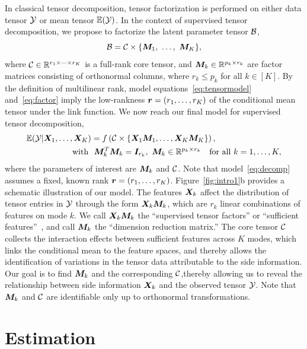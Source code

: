 \documentclass{article}
\theoremstyle{definition}
\theoremstyle{definition}
\begin{document}
In classical tensor decomposition, tensor factorization is performed on either data tensor $\mathcal{Y}$ or mean tensor $\mathbb{E}(\mathcal{Y})$. In the context of supervised tensor decomposition, we propose to factorize the latent parameter tensor $\mathcal{B}$,
\begin{equation}\label{eq:factor}
\mathcal{B}=\mathcal{C}\times\{\bm M_1,\ \ldots,\ \bm M_K\},
\end{equation}
where $\mathcal{C}\in\mathbb{R}^{r_1\times \cdots \times r_K}$ is a full-rank core tensor, and $\bm M_k\in\mathbb{R}^{p_k\times r_k}$ are factor matrices consisting of orthonormal columns, where $r_k\leq p_k$ for all $k\in[K]$. By the definition of multilinear rank, model equations~\eqref{eq:tensormodel} and~\eqref{eq:factor} imply the low-rankness $\bm{r}=(r_1,\ldots,r_K)$ of the conditional mean tensor under the link function. We now reach our final model for supervised tensor decomposition,
\begin{align}\label{eq:decomp}
\mathbb{E}(\tY|\mX_1,\ldots,\mX_K) &= f\left(\tC\times\{\mX_1\mM_1, \ldots, \mX_K\mM_K\}\right),\notag\\
\text{with} \ &\ \mM_k^T\mM_k = \mI_{r_k},\ \mM_k\in\mathbb{R}^{p_k\times r_k}\quad \text{for all }k=1,\ldots,K,
\end{align}
where the parameters of interest are $\bm M_k$ and $\mathcal{C}$. Note that model~\eqref{eq:decomp} assumes a fixed, known rank $\bm{r}=(r_1,\ldots,r_K)$. Figure~\ref{fig:intro1}b provides a schematic illustration of our model. The features $\bm X_k$ affect the distribution of tensor entries in $\mathcal{Y}$ through the form $\bm X_k\bm M_k$, which are $r_k$ linear combinations of features on mode $k$. We call $\bm X_k\bm M_k$ the ``supervised tensor factors'' or ``sufficient features''~\citep{adragni2009sufficient}, and call $\bm M_k$ the ``dimension reduction matrix.'' The core tensor $\mathcal{C}$ collects the interaction effects between sufficient features across $K$ modes, which links the conditional mean to the feature spaces, and thereby allows the identification of variations in the tensor data attributable to the side information. Our goal is to find $\bm M_k$ and the corresponding $\mathcal{C}$,thereby allowing us to reveal the relationship between side information $\bm X_k$ and the observed tensor $\mathcal{Y}$. Note that $\bm M_k$ and $\mathcal{C}$ are identifiable only up to orthonormal transformations.  

\vspace{-.3cm}
\section{Estimation}
\end{document}

